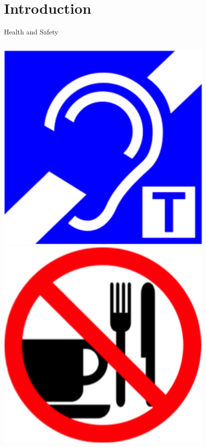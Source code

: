 \part{Introduction}
\begin{frame}
\partpage
\end{frame}

\begin{frame}{Health and Safety}
\begin{columns}[c]
\begin{column}{0.33\textwidth}
\begin{center}
\includegraphics[width=0.8\textwidth,height=0.5\textheight,keepaspectratio]{imgs/health-safety-1.png}\\
\includegraphics[width=0.8\textwidth,height=0.5\textheight,keepaspectratio]{imgs/health-safety-4.png}

\end{center}
\end{column}
\end{columns}
\end{frame}
